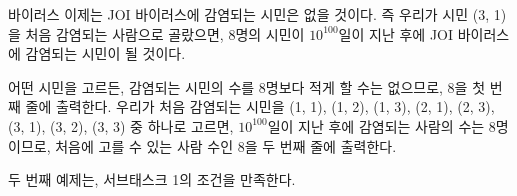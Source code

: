 \begin{problem}{바이러스}
	이제는 JOI 바이러스에 감염되는 시민은 없을 것이다. 즉 우리가 시민 (3, 1)을 처음 감염되는 사람으로 골랐으면, 8명의 시민이 $10^{100}$일이 지난 후에 JOI 바이러스에 감염되는 시민이 될 것이다.
	
	어떤 시민을 고르든, 감염되는 시민의 수를 8명보다 적게 할 수는 없으므로, 8을 첫 번째 줄에 출력한다. 우리가 처음 감염되는 시민을 (1, 1), (1, 2), (1, 3), (2, 1), (2, 3), (3, 1), (3, 2), (3, 3) 중 하나로 고르면, $10^{100}$일이 지난 후에 감염되는 사람의 수는 8명이므로, 처음에 고를 수 있는 사람 수인 8을 두 번째 줄에 출력한다.
	
	두 번째 예제는, 서브태스크 1의 조건을 만족한다.
	
\end{problem}

